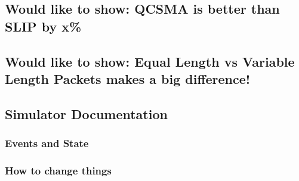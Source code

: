 \documentclass{IEEEtran}%
\begin{document}
\subsection{Would like to show: QCSMA is better than SLIP by x\%}
\subsection{Would like to show: Equal Length vs Variable Length Packets makes a big difference!}
\subsection{Simulator Documentation}
\subsubsection{Events and State}
\subsubsection{How to change things}

 
\end{document}

